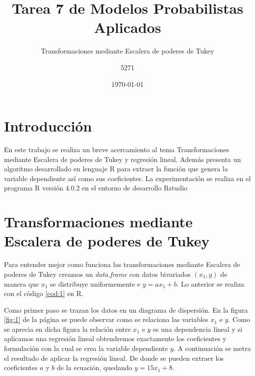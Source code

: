 \documentclass{article}
\title{Tarea 7 de Modelos Probabilistas Aplicados}
\subtitle{Transformaciones mediante Escalera de poderes de Tukey }
\author{5271}
\date{\today}
\begin{document}
\maketitle

\section{Introducción}

En este trabajo se realiza un breve acercamiento al tema Transformaciones mediante Escalera de poderes de Tukey y regresión lineal. Además presenta un algoritmo desarrollado en lenguaje R para extraer la función que genera la variable dependiente así como sus coeficientes. La experimentación se realiza en el programa R versión 4.0.2 \cite{r} en el entorno de desarrollo Rstudio \cite{rstudio}

\section{Transformaciones mediante Escalera de poderes de Tukey}

Para entender mejor como funciona las transformaciones mediante Escalera de poderes de Tukey creamos un \textit{data.frame} con datos bivariados $(x_{1} , y)$ de manera que $x_{1}$ se distribuye uniformemente e $y = ax_{1}+b$. Lo anterior se realiza con el código \ref{cod:1} en R. 
\begin{center}

\label{cod:1}
\end{center}

Como primer paso se trazan los datos en un diagrama de dispersión. En la figura \ref{fig:1} de la página \pageref{fig:1} se puede observar como se relaciona las variables $x_{1}$ e $y$. Como se aprecia en dicha figura la relación entre $x_{1}$ e $y$ es una dependencia lineal y si aplicamos una regresión lineal obtendremos exactamente los coeficientes y formulación con la cual se crea la variable dependiente $y$. A continuación se metra el resultado de aplicar la regresión lineal. De donde se pueden extraer los coeficientes $a$ y $b$ de la ecuación, quedando $y = 15x_{1}+8$.  


\end{document}
